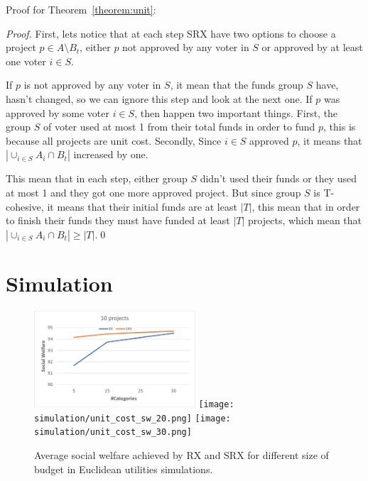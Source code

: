 \documentclass[runningheads]{llncs}
\begin{document}
\begin{subappendices}


Proof for Theorem~\ref{theorem:unit}:

\begin{proof}
First, lets notice that at each step SRX have two options to choose a project $p\in A\setminus B_t$, either $p$ not approved by any voter in $S$ or approved by at least one voter $i\in S$.

If $p$ is  not approved by any voter in $S$, it mean that the funds group $S$ have, hasn't changed, so we can ignore this step and look at the next one. If $p$ was approved by some voter $i\in S$, then happen two important things. First, the group $S$ of voter used at most 1 from their total funds in order to fund $p$, this is because all projects are unit cost. Secondly, Since $i\in S$ approved $p$, it means that $|\cup_{i\in S}A_i\cap B_t|$ increased by one.

This mean that in each step, either group $S$ didn't used their funds or they used at most 1 and they got one more approved project. But since group $S$ is T-cohesive, it means that their initial funds are at least $|T|$, this mean that in order to finish their funds they must have funded at least $|T|$ projects, which mean that $|\cup_{i\in S}A_i\cap B_t|\geq |T|$.\qed
\end{proof}

\section{Simulation}\label{app:sim}



\begin{figure}[t]
\begin{center}
\includegraphics[width=6cm]{simulation/unit_cost_sw_10.png}
\texttt{[image: simulation/unit\_cost\_sw\_20.png]}
\texttt{[image: simulation/unit\_cost\_sw\_30.png]}
\caption{Average social welfare achieved by RX and SRX for different size of budget in Euclidean utilities simulations.
}\label{fig:sw_all1}
\end{center}
\end{figure}


\end{subappendices}
\end{document}

